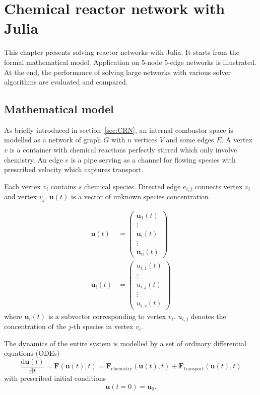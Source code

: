 \chapter{Chemical reactor network with Julia} \label{ch:network}

This chapter presents solving reactor networks with Julia. It starts from the formal mathematical model. Application on 5-node 5-edge networks is illustrated. At the end, the performance of solving large networks with various solver algorithms are evaluated and compared. 

\section{Mathematical model}

As briefly introduced in section~\ref{sec:CRN}, an internal combustor space is modelled as a network of graph $G$ with $n$ vertices $V$ and some edges $E$. A vertex $v$ is a container with chemical reactions perfectly stirred which only involve chemistry. An edge $e$ is a pipe serving as a channel for flowing species with prescribed velocity which captures transport.

Each vertex $v_i$ contains $s$ chemical species. Directed edge $e_{i,j}$ connects vertex $v_i$ and vertex $v_j$. $\mathbf u(t)$ is a vector of unknown species concentration.

\begin{align}
    \mathbf u(t) &= 
    \begin{pmatrix}
        \mathbf u_1(t) \\
        \vdots \\
        \mathbf u_i(t) \\
        \vdots \\
        \mathbf u_n(t)
    \end{pmatrix} \\
    \mathbf u_i(t) &=
    \begin{pmatrix}
        u_{i,1}(t) \\
        \vdots \\
        u_{i,j}(t) \\
        \vdots \\
        u_{i,s}(t)
    \end{pmatrix}
\end{align}
where $\mathbf u_i(t)$ is a subvector corresponding to vertex $v_i$. $u_{i,j}$ denotes the concentration of the $j$-th species in vertex $v_i$.

The dynamics of the entire system is modelled by a set of ordinary differential equations (ODEs)
\begin{equation}
    \frac{\mathrm d \mathbf u (t)}{\mathrm d t} = \mathbf F ( \mathbf u (t), t) =  \mathbf F_{\mathrm{chemistry}} ( \mathbf u (t), t) + \mathbf F_{\mathrm{transport}} ( \mathbf u (t), t)
\end{equation}
with prescribed initial conditions
\begin{equation}
    \mathbf u(t = 0) = \mathbf u_0.
\end{equation}

